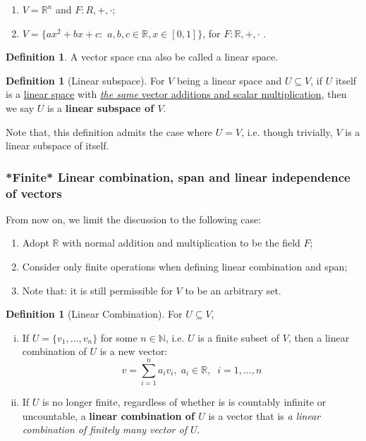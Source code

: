\documentclass[12pt]{article}
\newcommand{\N}{{\mathbb N}}
\newcommand{\R}{{\mathbb R}}
\theoremstyle{definition}
\newtheorem{definition}[theorem]{Definition}
\theoremstyle{plain}
\begin{document}
\begin{example}
    \begin{enumerate}
        \item $V = \R^n$ and $F: R, +, \cdot$\quad ;
        \item $V = \{ax^2 + bx + c: $ $a, b, c\in \R, x \in [0,1]\}$, for $F:\R, 
            +, \cdot$ \quad .
    \end{enumerate}
\end{example}

\begin{definition}
    A vector space cna also be called a linear space.
\end{definition}

\begin{definition}
    [Linear subspace]
    For $V$ being a linear space and $U\subseteq V$, if $U$ itself is a 
    \underline{linear space} with \underline{\textit{the same} vector additions 
    and scalar multiplication}, then we say $U$ is a \textbf{\small linear subspace of $V$}.

    Note that, this definition admits the case where $U = V$, i.e. though 
    trivially, $V$ is a linear subspace of itself.
\end{definition}

\subsubsection{*Finite* Linear combination, span and linear independence of vectors}
From now on, we limit the discussion to the following case:
\begin{enumerate}
    \item Adopt $\R$ with normal addition and multiplication to be the field 
        $F$;
    \item Consider only finite operations when defining linear combination and 
        span;
    \item Note that: it is still permissible for $V$ to be an arbitrary set.
\end{enumerate}

\begin{definition}
    [Linear Combination] For $U \subseteq V$, 
    \begin{enumerate}[(i)]
        \item If $U = \{v_1, \ldots, v_n\}$ for some $n \in \N$, i.e. $U$ is a finite subset of $V$, 
            then a linear combination of $U$ is a new vector: 
            \[
                v = \sum_{i=1}^n a_i v_i, \; a_i \in \R, \;\; i = 1, \ldots, n
            \]
        \item If $U$ is no longer finite, regardless of whether is is countably 
            infinite or uncountable, a \textbf{linear combination of $U$} is a vector 
            that is \textit{a linear combination of finitely many vector of $U$}.
    \end{enumerate}
\end{definition}
\end{document}
